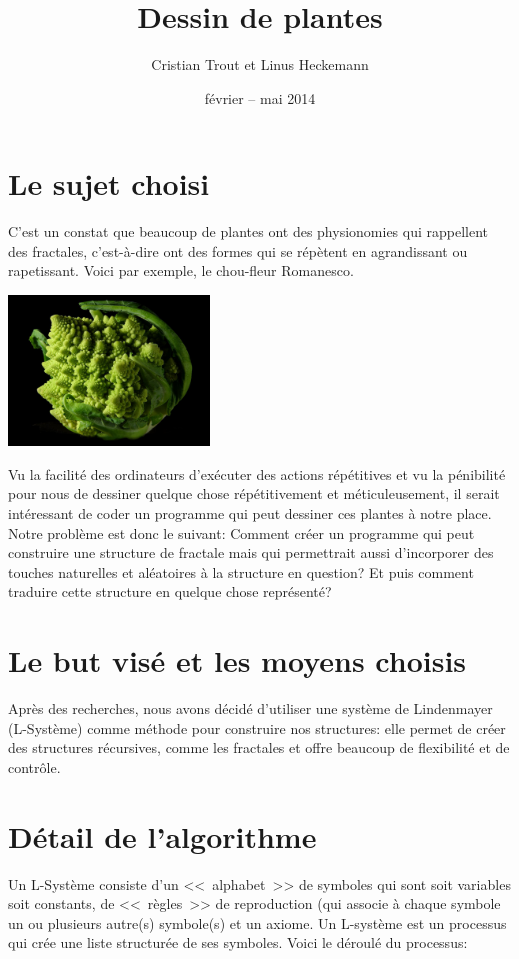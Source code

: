 \documentclass[a4paper]{article}
\title{Dessin de plantes}
\author{Cristian Trout et Linus Heckemann}
\date{février -- mai 2014}
\begin{document}
\maketitle

\section{Le sujet choisi}
C’est un constat que beaucoup de plantes ont des physionomies qui rappellent des fractales, c’est-à-dire ont des formes qui se répètent en agrandissant ou rapetissant. Voici par exemple, le chou-fleur Romanesco.

\hspace{\fill}\includegraphics[width=0.4\textwidth]{rapport/Fractal_Broccoli}\hspace{\fill}

Vu la facilité des ordinateurs d’exécuter des actions répétitives et vu la pénibilité pour nous de dessiner quelque chose répétitivement et méticuleusement, il serait intéressant de coder un programme qui peut dessiner ces plantes à notre place. Notre problème est donc le suivant: 
Comment créer un programme qui peut construire une structure de fractale mais qui permettrait aussi d’incorporer des touches naturelles et aléatoires à la structure en question? Et puis comment traduire cette structure en quelque chose représenté?

\section{Le but visé et les moyens choisis}
Après des recherches, nous avons décidé d’utiliser une système de Lindenmayer (L-Système) comme méthode pour construire nos structures: elle permet de créer des structures récursives, comme les fractales et offre beaucoup de flexibilité et de contrôle.

\section{Détail de l'algorithme}
Un L-Système consiste d’un <<~alphabet~>> de symboles qui sont soit variables soit  constants, de <<~règles~>> de reproduction (qui associe à chaque symbole un ou plusieurs autre(s) symbole(s) et un axiome. Un L-système est un processus qui crée une liste structurée de ses symboles. Voici le déroulé du processus:
\end{document}

